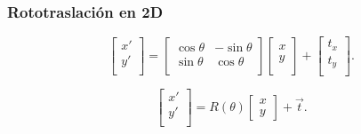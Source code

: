 \begin{frame}
    \frametitle{Rototraslación en 2D}

    \begin{equation*}
        {\displaystyle {\begin{bmatrix}x'\\y'\\\end{bmatrix}}={\begin{bmatrix}\cos \theta &-\sin \theta \\\sin \theta &\cos \theta \\\end{bmatrix}}{\begin{bmatrix}x\\y\\\end{bmatrix}}+{\begin{bmatrix}t_x\\t_y\\\end{bmatrix}}.}
    \end{equation*}

    \begin{equation*}
        {\displaystyle {\begin{bmatrix}x'\\y'\\\end{bmatrix}}={R(\theta )\begin{bmatrix} x\\y\end{bmatrix}}+ \vec{t}.}
    \end{equation*}
\end{frame}


